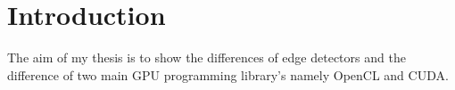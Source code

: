 \chapter{Introduction}

The aim of my thesis is to show the differences of edge detectors and the difference of two main GPU programming library's namely OpenCL and CUDA.